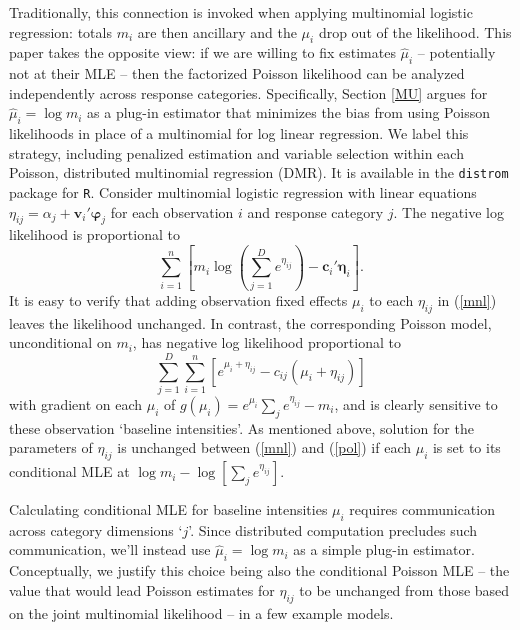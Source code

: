 \documentclass[12pt]{article}
\newcommand{\bs}[1]{\boldsymbol{#1}}
\newcommand{\bm}[1]{\mathbf{#1}}
\newcommand{\cd}[1]{{\tt#1}}
\begin{document}
Traditionally, this connection is invoked when applying multinomial logistic
regression: totals $m_i$ are then ancillary and the $\mu_i$ drop out of the
likelihood.  This paper takes the opposite view: if we are willing to fix
estimates $\hat\mu_i$ -- potentially not at their MLE -- then the factorized
Poisson likelihood can be analyzed independently across response categories.
Specifically, Section \ref{MU} argues for $\hat\mu_i = \log m_i$ as a plug-in
estimator that minimizes the bias from using Poisson likelihoods in place of a
multinomial for log linear regression. We label this strategy, including
penalized estimation and variable selection within each Poisson, distributed
multinomial regression (DMR).  It is available in the \cd{distrom} package for
\cd{R}.
Consider multinomial logistic regression with linear equations $\eta_{ij} =
\alpha_{j} + \bm{v}_i'\bs{\varphi}_j$ for each observation $i$ and response
category $j$.  The negative log likelihood is proportional to 
\begin{equation}
\label{mnl} \sum_{i=1}^n\left[ m_i\log\left(\sum_{j=1}^D e^{\eta_{ij}}\right)
- \bm{c}_{i}'\bs{\eta}_{i} \right]. 
\end{equation} 
It is easy to verify that adding observation fixed effects $\mu_i$ to each
$\eta_{ij}$ in (\ref{mnl}) leaves the likelihood unchanged.  In contrast, the
corresponding Poisson model, unconditional on $m_i$, has negative log
likelihood proportional to 
\begin{equation} \label{pol}
\sum_{j=1}^D\sum_{i=1}^n\left[ e^{\mu_i + \eta_{ij}} - c_{ij}(\mu_i +
\eta_{ij}) \right] 
\end{equation} 
with gradient on each $\mu_i$ of $g(\mu_i) =
e^{\mu_i}\sum_j e^{\eta_{ij}} - m_i$, and  is clearly sensitive to these
observation `baseline intensities'.  As mentioned above, solution for the
parameters of $\eta_{ij}$ is unchanged between (\ref{mnl}) and (\ref{pol}) if
each $\mu_i$ is set to its conditional MLE at $\log m_i - \log \left[\sum_j
e^{\eta_{ij}}\right]$.

Calculating conditional MLE for baseline intensities $\mu_i$ requires
communication across category dimensions `$j$'. Since distributed computation
precludes such communication, we'll instead use  $\hat \mu_i = \log m_i$ as a
simple plug-in estimator. Conceptually, we justify this choice being also the
conditional Poisson MLE -- the value that would lead  Poisson estimates for
$\eta_{ij}$ to be unchanged from those based on the  joint multinomial
likelihood  -- in a few example models.
\end{document}

